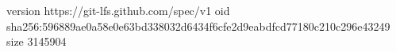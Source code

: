 version https://git-lfs.github.com/spec/v1
oid sha256:596889ae0a58e0e63bd338032d6434f6cfe2d9eabdfcd77180c210c296e43249
size 3145904
